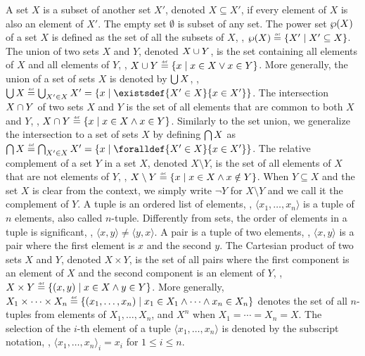 A set $X$ is a subset of another set $X'$, denoted $X \subseteq X'$, if every element of $X$ is also an element of $X'$. The empty set $\emptyset$ is subset of any set. The power set $\wp(X)$ of a set $X$ is defined as the set of all the subsets of $X$, \ie, $\setof{X} \defeq \setdef{X'}{X' \subseteq X}$. The union of two sets $X$ and $Y$, denoted $X \cup Y$, is the set containing all elements of $X$ and all elements of $Y$, \ie, $X \setjoin Y \defeq \setdef{x}{x \in X \lor x \in Y}$. More generally, the union of a set of sets $X$ is denoted by $\bigcup X$, \ie, $\bigsetjoin X \defeq \bigsetjoin_{X' \in X} X' = \setdef{x}{\existsdef{X' \in X}{x \in X'}}$. The intersection $X \cap Y$ of two sets $X$ and $Y$ is the set of all elements that are common to both $X$ and $Y$, \ie, $X \setmeet Y \defeq \setdef{x}{x \in X \land x \in Y}$.
Similarly to the set union, we generalize the intersection to a set of sets $X$ by defining $\bigcap X$ as $\bigsetmeet X \defeq \bigsetmeet_{X' \in X} X' = \setdef{x}{\foralldef{X' \in X}{x \in X'}}$. The relative complement of a set $Y$ in a set $X$, denoted $X \setminus Y$, is the set of all elements of $X$ that are not elements of $Y$, \ie, $X \setminus Y \defeq \setdef{x}{x \in X \land x \notin Y}$. When $Y \subseteq X$ and the set $X$ is clear from the context, we simply write $\neg Y$ for $X \setminus Y$ and we call it the complement of $Y$.
A tuple is an ordered list of elements, \eg, $\langle x_1, \dots, x_n \rangle$ is a tuple of $n$ elements, also called $n$-tuple. Differently from sets, the order of elements in a tuple is significant, \eg, $\langle x, y \rangle \neq \langle y, x \rangle$.
A pair is a tuple of two elements, \eg, $\langle x, y \rangle$ is a pair where the first element is $x$ and the second $y$.
The Cartesian product of two sets $X$ and $Y$, denoted $X \times Y$, is the set of all pairs where the first component is an element of $X$ and the second component is an element of $Y$, \ie, $X \times Y \defeq \setdef{(x, y)}{x \in X \land y \in Y}$.
More generally, $X_1 \times \cdots \times X_n \defeq \setdef{(x_1, \ldots, x_n)}{x_1 \in X_1 \land \cdots \land x_n \in X_n}$ denotes the set of all $n$-tuples from elements of $X_1, \dots, X_n$, and $X^n$ when $X_1 = \cdots = X_n = X$.
The selection of the
$i$-th element of a tuple
$\langle{x_1, \dots, x_n}\rangle$ is denoted by the subscript notation, \ie,
${\langle{x_1, \dots, x_n}\rangle}_i = x_i$ for
$1 \le i \le n$.

